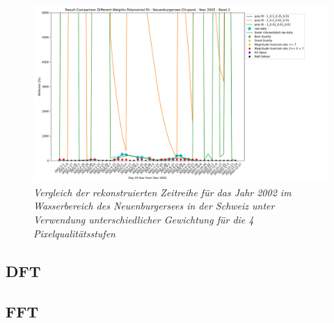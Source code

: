 \documentclass[11pt]{report}
\begin{document}
\begin{figure}[H]
\hspace*{-2.5cm}
\includegraphics[scale=0.55]{./Grafiken/Fitting/Fitting_method_comparison/selected_comparisons_poly/Fit_comparison_poly_all_Neuenburgersee-CH-pond_2002.png}
\caption{\textit{Vergleich der rekonstruierten Zeitreihe für das Jahr 2002 im Wasserbereich des Neuenburgersees in der Schweiz unter Verwendung unterschiedlicher Gewichtung für die 4 Pixelqualitätsstufen}}
\label{fig:compare_fit_sg_raf_it_2002_ch_neub}
\end{figure}
\subsection{DFT}
\subsection{FFT}
\end{document}
